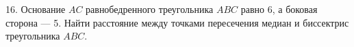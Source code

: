 16. Основание $AC$ равнобедренного треугольника $ABC$ равно 6, а боковая сторона --- 5. Найти расстояние между точками пересечения медиан и биссектрис треугольника $ABC.$\\
